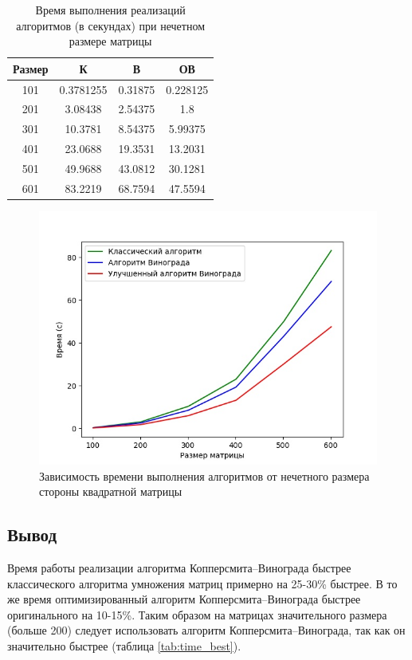 \begin{table}[p]
    \caption{\centering Время выполнения реализаций алгоритмов (в секундах) при нечетном размере матрицы}
    \centering
    \begin{tabular}{|c|c|c|c|}
    \hline
    Размер & К      & В      & ОВ     \\ \hline
    101    & 0.3781255 & 0.31875 & 0.228125 \\ \hline
    201    & 3.08438  & 2.54375  & 1.8  \\ \hline
    301    & 10.3781  & 8.54375 & 5.99375 \\ \hline
    401    & 23.0688  & 19.3531 & 13.2031 \\ \hline
    501    & 49.9688  & 43.0812 & 30.1281 \\ \hline
    601    & 83.2219 & 68.7594 & 47.5594\\ \hline
    \end{tabular}
    \label{tab:time_worst}
\end{table}

\begin{figure}
    \centering
    \includegraphics[scale=0.65]{nechet_matr.jpeg}
    \caption{Зависимость времени выполнения алгоритмов от нечетного размера стороны квадратной матрицы}
    \label{img:plot_worst}
\end{figure}

\subsection{Вывод}

Время работы реализации алгоритма Копперсмита–Винограда быстрее классического алгоритма умножения матриц примерно на 25-30\% быстрее. В то же время оптимизированный алгоритм Копперсмита–Винограда быстрее оригинального на 10-15\%. Таким образом на матрицах значительного размера (больше 200) следует использовать алгоритм Копперсмита–Винограда, так как он значительно быстрее (таблица \ref{tab:time_best}).


